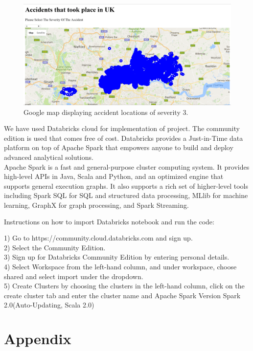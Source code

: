 \documentclass{acm_proc_article-sp}
\begin{document}
\begin{figure}
  \centering
      \includegraphics[width=1.0\textwidth]{images/googlemap3.png}
  \caption{Google map displaying accident locations of severity 3.}
\end{figure}


We have used Databricks cloud for implementation of project. The community edition is used that comes free of cost.
Databricks provides a Just-in-Time data platform on top of Apache Spark that empowers anyone to build and deploy advanced analytical solutions.\\
Apache Spark is a fast and general-purpose cluster computing system. It provides high-level APIs in Java, Scala and Python, and an optimized engine that supports general execution graphs. It also supports a rich set of higher-level tools including Spark SQL for SQL and structured data processing, MLlib for machine learning, GraphX for graph processing, and Spark Streaming. \cite{apachespark}


Instructions on how to import Databricks notebook and run the code:

1) Go to https://community.cloud.databricks.com and sign up.\\
2) Select the Community Edition.\\
3) Sign up for Databricks Community Edition by entering personal details.\\
4) Select Workspace from the left-hand column, and under workspace, choose shared and select import under the dropdown.\\
5) Create Clusters by choosing the clusters in the left-hand column, click on the create cluster tab and enter the cluster name and Apache Spark Version Spark 2.0(Auto-Updating, Scala 2.0)\\


\section{Appendix}
\end{document}
